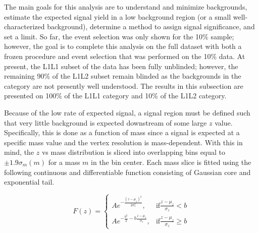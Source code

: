 
The main goals for this analysis are to understand and minimize backgrounds, estimate the expected signal yield in a low background region (or a small well-characterized background), determine a method to assign signal significance, and set a limit. So far, the event selection was only shown for the 10\% sample; however, the goal is to complete this analysis on the full dataset with both a frozen procedure and event selection that was performed on the 10\% data. At present, the L1L1 subset of the data has been fully unblinded; however, the remaining 90\% of the L1L2 subset remain blinded as the backgrounds in the category are not presently well understood. The results in this subsection are presented on 100\% of the L1L1 category and 10\% of the L1L2 category.

Because of the low rate of expected signal, a signal region must be defined such that very little background is expected downstream of some large $z$ value. Specifically, this is done as a function of mass since a signal is expected at a specific mass value and the vertex resolution is mass-dependent. With this in mind, the $z$ vs mass distribution is sliced into overlapping bins equal to $\pm 1.9\sigma_m(m)$ for a mass $m$ in the bin center. Each mass slice is fitted using the following continuous and differentiable function consisting of Gaussian core and exponential tail.

\begin{equation}
    F(z) = \left\{
    \begin{array}{ll}
    A e^{-\frac{(z-\mu_z)^2}{2\sigma_z^2}}, & \mathrm{if} \frac{z-\mu_z}{\sigma_z}<b \\
    A e^{-\frac{b^2}{2}-b\frac{z-\mu_z}{\sigma_z}}, & \mathrm{if} \frac{z-\mu_z}{\sigma_z} \ge b
    \end{array}
    \label{eqn:tail_fit}
\end{equation}
            
